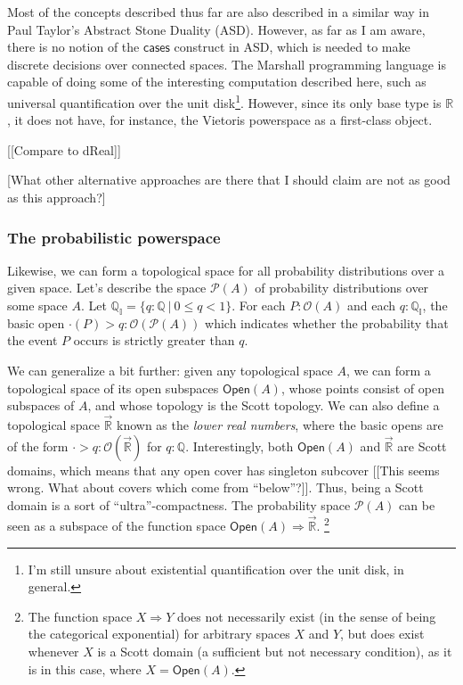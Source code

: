 \documentclass{article}           %
\newcommand{\R}{\mathbb{R}}
\newcommand{\rat}{\mathbb{Q}}
\newcommand{\suchthat}{\ |\ }
\newcommand{\Open}[1]{\mathcal{O}({#1})}
\newcommand{\Prob}{\mathcal{P}}
\newcommand{\ratint}{\rat_\mathbb{I}}
\newcommand{\lowerT}[1]{\overrightarrow{#1}}
\begin{document}
Most of the concepts described thus far are also described in a similar way in Paul Taylor's Abstract Stone Duality (ASD). However, as far as I am aware, there is no notion of the $\mathsf{cases}$ construct in ASD, which is needed to make discrete decisions over connected spaces. The Marshall programming language is capable of doing some of the interesting computation described here, such as universal quantification over the unit disk\footnote{I'm still unsure about existential quantification over the unit disk, in general.}. However, since its only base type is $\R$, it does not have, for instance, the Vietoris powerspace as a first-class object.

[[Compare to dReal]]

[What other alternative approaches are there that I should claim are not as good as this approach?]

\subsubsection{The probabilistic powerspace}

Likewise, we can form a topological space for all probability distributions over a given space. Let's describe the space $\Prob(A)$ of probability distributions over some space $A$. Let $\ratint = \{q : \rat \suchthat 0 \le q < 1 \}$. For each $P : \Open{A}$ and each $q : \ratint$, the basic open $\cdot(P) > q : \Open{\Prob(A)}$ which indicates whether the probability that the event $P$ occurs is strictly greater than $q$.

We can generalize a bit further: given any topological space $A$, we can form a topological space of its open subspaces $\mathsf{Open}(A)$, whose points consist of open subspaces of $A$, and whose topology is the Scott topology. We can also define a topological space $\lowerT{\R}$ known as the \emph{lower real numbers}, where the basic opens are of the form $\cdot > q : \Open{\lowerT{\R}}$ for $q : \rat$. Interestingly, both $\mathsf{Open}(A)$ and $\lowerT{\R}$ are Scott domains, which means that any open cover has singleton subcover [[This seems wrong. What about covers which come from ``below''?]]. Thus, being a Scott domain is a sort of ``ultra''-compactness. The probability space $\Prob(A)$ can be seen as a subspace of the function space $\mathsf{Open}(A) \Rightarrow \lowerT{\R}$. \footnote{The function space $X \Rightarrow Y$ does not necessarily exist (in the sense of being the categorical exponential) for arbitrary spaces $X$ and $Y$, but does exist whenever $X$ is a Scott domain (a sufficient but not necessary condition), as it is in this case, where $X = \mathsf{Open}(A)$.}
\end{document}
